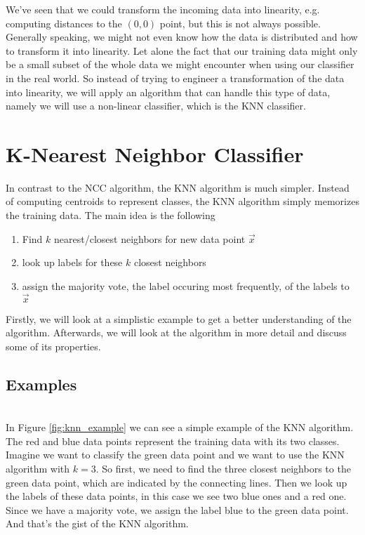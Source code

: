 We've seen that we could transform the incoming data into linearity, e.g. computing distances to the $(0, 0)$ point, but this is not always possible.
Generally speaking, we might not even know how the data is distributed and how to transform it into linearity.
Let alone the fact that our training data might only be a small subset of the whole data we might encounter when using our classifier in the real world.
So instead of trying to engineer a transformation of the data into linearity, we will apply an algorithm that can handle this type of data, namely we will use a non-linear classifier, which is the KNN classifier.

\section{K-Nearest Neighbor Classifier}
In contrast to the NCC algorithm, the KNN algorithm is much simpler.
Instead of computing centroids to represent classes, the KNN algorithm simply memorizes the training data.
The main idea is the following
\begin{enumerate}
  \item Find $k$ nearest/closest neighbors for new data point $\vec{x}$
  \item look up labels for these $k$ closest neighbors
  \item assign the majority vote, the label occuring most frequently, of the labels to $\vec{x}$
\end{enumerate}
Firstly, we will look at a simplistic example to get a better understanding of the algorithm.
Afterwards, we will look at the algorithm in more detail and discuss some of its properties.

\subsection{Examples}
\framedtext{\color{red}{TODO: add initial example plot here}}\\
In Figure \ref{fig:knn_example} we can see a simple example of the KNN algorithm.
The red and blue data points represent the training data with its two classes.
Imagine we want to classify the green data point and we want to use the KNN algorithm with $k=3$.
So first, we need to find the three closest neighbors to the green data point, which are indicated by the connecting lines.
Then we look up the labels of these data points, in this case we see two blue ones and a red one.
Since we have a majority vote, we assign the label blue to the green data point.\\
And that's the gist of the KNN algorithm.

